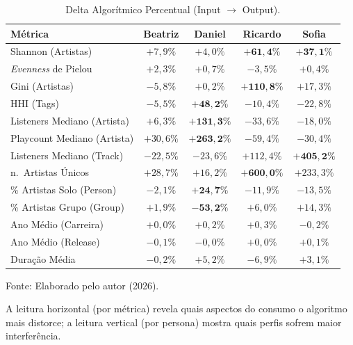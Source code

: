 \documentclass[12pt, %
openright,
oneside, %
a4paper,    %
english,   %
brazil]{facom-ufu-abntex2}
\newcommand{\fontefig}[1]{%
  \par\nopagebreak\vspace{0.15cm}%
  {\centering\footnotesize Fonte: #1\par}%
}
\begin{document}
\begin{table}[H]
\centering
\caption{Delta Algorítmico Percentual (Input $\rightarrow$ Output).}
\label{tab:delta}
\footnotesize
\begin{tabular}{>{\raggedright\arraybackslash}p{5.5cm} c c c c}
\toprule
\textbf{Métrica} & \textbf{Beatriz} & \textbf{Daniel} & \textbf{Ricardo} & \textbf{Sofia} \\
\midrule
Shannon (Artistas)            & $+7{,}9\%$  & $+4{,}0\%$            & $\mathbf{+61{,}4\%}$  & $\mathbf{+37{,}1\%}$ \\
\emph{Evenness} de Pielou     & $+2{,}3\%$  & $+0{,}7\%$            & $-3{,}5\%$            & $+0{,}4\%$ \\
Gini (Artistas)               & $-5{,}8\%$  & $+0{,}2\%$            & $\mathbf{+110{,}8\%}$ & $+17{,}3\%$ \\
HHI (Tags)                    & $-5{,}5\%$  & $\mathbf{+48{,}2\%}$  & $-10{,}4\%$           & $-22{,}8\%$ \\
Listeners Mediano (Artista)   & $+6{,}3\%$  & $\mathbf{+131{,}3\%}$ & $-33{,}6\%$           & $-18{,}0\%$ \\
Playcount Mediano (Artista)   & $+30{,}6\%$ & $\mathbf{+263{,}2\%}$ & $-59{,}4\%$           & $-30{,}4\%$ \\
Listeners Mediano (Track)     & $-22{,}5\%$ & $-23{,}6\%$           & $+112{,}4\%$         & $\mathbf{+405{,}2\%}$ \\
n.\ Artistas Únicos           & $+28{,}7\%$ & $+16{,}2\%$           & $\mathbf{+600{,}0\%}$ & $+233{,}3\%$ \\
\% Artistas Solo (Person)     & $-2{,}1\%$  & $\mathbf{+24{,}7\%}$  & $-11{,}9\%$           & $-13{,}5\%$ \\
\% Artistas Grupo (Group)     & $+1{,}9\%$  & $\mathbf{-53{,}2\%}$  & $+6{,}0\%$           & $+14{,}3\%$ \\
Ano Médio (Carreira)          & $+0{,}0\%$  & $+0{,}2\%$            & $+0{,}3\%$           & $-0{,}2\%$ \\
Ano Médio (Release)           & $-0{,}1\%$  & $-0{,}0\%$            & $+0{,}0\%$           & $+0{,}1\%$ \\
Duração Média                 & $-0{,}2\%$  & $+5{,}2\%$            & $-6{,}9\%$           & $+3{,}1\%$ \\
\bottomrule
\end{tabular}
\fontefig{Elaborado pelo autor (2026).}
\end{table}

A leitura horizontal (por métrica) revela quais aspectos do consumo o algoritmo
mais distorce; a leitura vertical (por persona) mostra quais perfis sofrem maior
interferência.
\end{document}
